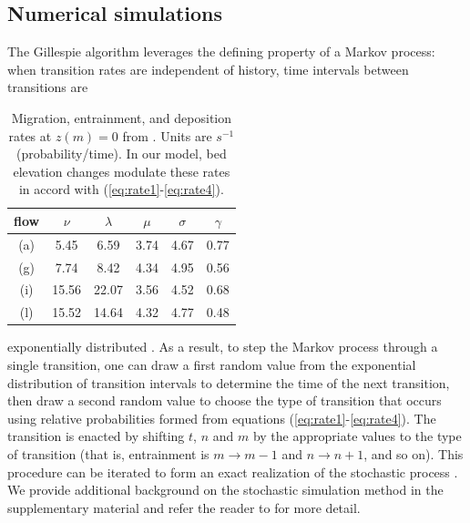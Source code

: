 \documentclass[draft]{agujournal2018}
\begin{document}
\subsection{Numerical simulations}
\label{sec:numerical}

The Gillespie algorithm leverages the defining property of a Markov process: when transition rates are independent of history, time intervals between transitions are \begin{table}
	\caption{Migration, entrainment, and deposition rates at $z(m)=0$ from \citet{Ancey2008}. Units are $s^{-1}$ (probability/time). In our model, bed elevation changes modulate these rates in accord with (\ref{eq:rate1}-\ref{eq:rate4}).}\label{tab:anceyparams}
	\begin{tabular}{cccccc} \\ 
		\toprule  
		flow & $\nu$ & $\lambda$ & $\mu$ & $\sigma$ & $\gamma$ \\
		\midrule
		(a) & 5.45  & 6.59  & 3.74 & 4.67 & 0.77 \\
		\midrule
		(g) & 7.74  & 8.42  & 4.34 & 4.95 & 0.56 \\
		\midrule
		(i) & 15.56 & 22.07 & 3.56 & 4.52 & 0.68 \\
		\midrule
		(l) & 15.52 & 14.64 & 4.32 & 4.77 & 0.48 \\
		\bottomrule
	\end{tabular}
\end{table}exponentially distributed \citep{Cox1965}.
As a result, to step the Markov process through a single transition, one can draw a first random value from the exponential distribution of transition intervals to determine the time of the next transition,
then draw a second random value to choose the type of transition that occurs using relative probabilities formed from equations (\ref{eq:rate1}-\ref{eq:rate4}). The transition is enacted by shifting $t$, $n$ and $m$ by the appropriate values to the type of transition (that is, entrainment is $m\rightarrow m-1$ and $n \rightarrow n+1$, and so on).
This procedure can be iterated to form an exact realization of the stochastic process \citep{Gillespie2007}.
We provide additional background on the stochastic simulation method in the supplementary material and refer the reader to \citet{Gillespie2007} for more detail.
\end{document}
